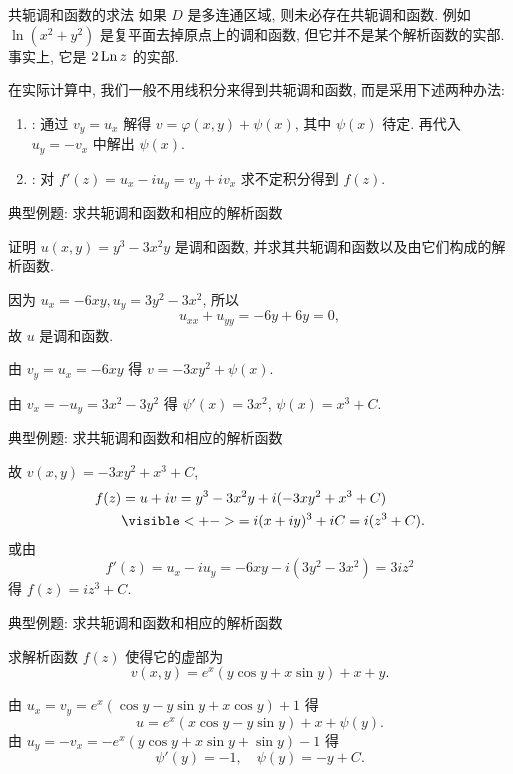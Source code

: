 \begin{frame}{共轭调和函数的求法}
\onslide<+->
如果 $D$ 是多连通区域, 则未必存在共轭调和函数.
\onslide<+->
例如 $\ln(x^2+y^2)$ 是复平面去掉原点上的调和函数, 但它并不是某个解析函数的实部.
\onslide<+->
事实上, 它是 $2\operatorname{Ln} z$ 的实部.

\onslide<+->
在实际计算中, 我们一般不用线积分来得到共轭调和函数, 而是采用下述两种办法:
\begin{enumerate}
\item {}: 通过 $v_y=u_x$ 解得 $v=\varphi(x,y)+\psi(x)$, 其中 $\psi(x)$ 待定.
\onslide<+->
再代入 $u_y=-v_x$ 中解出 $\psi(x)$.
\item {}: 对 $f'(z)=u_x-iu_y=v_y+iv_x$ 求不定积分得到 $f(z)$.
\end{enumerate}
\end{frame}


\begin{frame}{典型例题: 求共轭调和函数和相应的解析函数}
\begin{example}
证明 $u(x,y)=y^3-3x^2y$ 是调和函数, 并求其共轭调和函数以及由它们构成的解析函数.
\end{example}
\begin{solutions}
\indent
因为 $u_x=-6xy,u_y=3y^2-3x^2$,
\onslide<+->
所以
\[u_{xx}+u_{yy}=-6y+6y=0,\]
\onslide<+->
故 $u$ 是调和函数.

\indent
\onslide<+->
由 $v_y=u_x=-6xy$ 得 $v=-3xy^2+\psi(x)$.

\indent
\onslide<+->
由 $v_x=-u_y=3x^2-3y^2$ 得 $\psi'(x)=3x^2$,
\onslide<+->
$\psi(x)=x^3+C$.
\end{solutions}
\end{frame}


\begin{frame}{典型例题: 求共轭调和函数和相应的解析函数}
\begin{solutione}
\indent
故 $v(x,y)=-3xy^2+x^3+C$,
\onslide<+->
\begin{align*}
f(z)&=u+iv=y^3-3x^2y+i(-3xy^2+x^3+C)\\
&\visible<+->{=i(x+iy)^3+iC=i(z^3+C).}
\end{align*}
\onslide<+->
或由
\[f'(z)=u_x-iu_y=-6xy-i(3y^2-3x^2)=3iz^2\]
得 $f(z)=iz^3+C$.
\end{solutione}
\end{frame}


\begin{frame}{典型例题: 求共轭调和函数和相应的解析函数}
\begin{example}
求解析函数 $f(z)$ 使得它的虚部为
\[v(x,y)=e^x(y\cos y+x\sin y)+x+y.\]
\end{example}
\begin{solutions}
由 $u_x=v_y=e^x(\cos y-y\sin y+x\cos y)+1$ 得
\[u=e^x(x\cos y-y\sin y)+x+\psi(y).\]
\onslide<+->
由 $u_y=-v_x=-e^x(y\cos y+x\sin y+\sin y)-1$ 得
\[\psi'(y)=-1,\quad\psi(y)=-y+C.\]
\end{solutions}
\end{frame}


